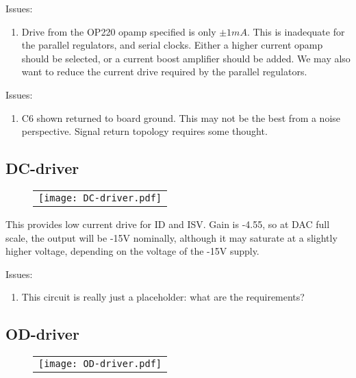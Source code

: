 \documentclass[a4paper,12pt]{article}
\begin{document}
Issues:
\begin{enumerate}
\item
Drive from the OP220 opamp specified is only $\pm1 mA$. This is inadequate for the parallel regulators, and serial clocks. Either a higher current opamp should be selected, or a current boost amplifier should be added. We may also want to reduce the current drive required by the parallel regulators.
\end{enumerate}

Issues:
\begin{enumerate}
\item
C6 shown returned to board ground. This may not be the best from a noise perspective. Signal return topology requires some thought.
\end{enumerate}



\subsection{DC-driver}
   \begin{figure}
   \begin{center}
   \begin{tabular}{c}
   \texttt{[image: DC-driver.pdf]}
   \end{tabular}
   \end{center}
   \end{figure}

This provides low current drive for ID and ISV. Gain is -4.55, so at DAC full scale, the output will be -15V nominally, although it may saturate at a slightly higher voltage, depending on the voltage of the -15V supply.


Issues:
\begin{enumerate}
\item
This circuit is really just a placeholder: what are the requirements?
\end{enumerate}


\subsection{OD-driver}
   \begin{figure}
   \begin{center}
   \begin{tabular}{c}
   \texttt{[image: OD-driver.pdf]}
   \end{tabular}
   \end{center}
   \end{figure}
\end{document}

